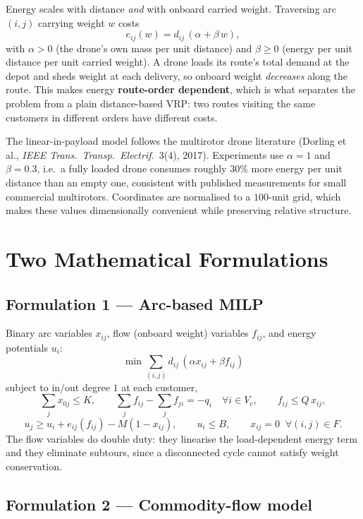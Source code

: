 \documentclass[11pt,a4paper]{article}
\begin{document}
Energy scales with distance \emph{and} with onboard carried weight. Traversing
arc $(i,j)$ carrying weight $w$ costs
\[
  e_{ij}(w) = d_{ij}\,(\alpha + \beta\,w),
\]
with $\alpha>0$ (the drone's own mass per unit distance) and $\beta\ge 0$ (energy
per unit distance per unit carried weight). A drone loads its route's total demand
at the depot and sheds weight at each delivery, so onboard weight \emph{decreases}
along the route. This makes energy \textbf{route-order dependent}, which is what
separates the problem from a plain distance-based VRP: two routes visiting the
same customers in different orders have different costs.

The linear-in-payload model follows the multirotor drone literature
(Dorling et al., \emph{IEEE Trans.\ Transp.\ Electrif.}\ 3(4), 2017). Experiments
use $\alpha=1$ and $\beta=0.3$, i.e.\ a fully loaded drone consumes roughly
$30\%$ more energy per unit distance than an empty one, consistent with published
measurements for small commercial multirotors. Coordinates are normalised to a
$100$-unit grid, which makes these values dimensionally convenient while
preserving relative structure.

\section{Two Mathematical Formulations}

\subsection{Formulation 1 --- Arc-based MILP}

Binary arc variables $x_{ij}$, flow (onboard weight) variables $f_{ij}$, and
energy potentials $u_i$:
\[
  \min \sum_{(i,j)} d_{ij}\,(\alpha x_{ij} + \beta f_{ij})
\]
subject to in/out degree $1$ at each customer,
\[
  \sum_{j} x_{0j} \le K,
  \qquad
  \sum_j f_{ij}-\sum_j f_{ji} = -q_i \quad \forall i \in V_c,
  \qquad
  f_{ij}\le Q\,x_{ij},
\]
\[
  u_j \ge u_i + e_{ij}(f_{ij}) - M(1-x_{ij}),
  \qquad
  u_i \le B,
  \qquad
  x_{ij}=0 \;\; \forall (i,j)\in F .
\]
The flow variables do double duty: they linearise the load-dependent energy term
and they eliminate subtours, since a disconnected cycle cannot satisfy weight
conservation.

\subsection{Formulation 2 --- Commodity-flow model}
\end{document}
